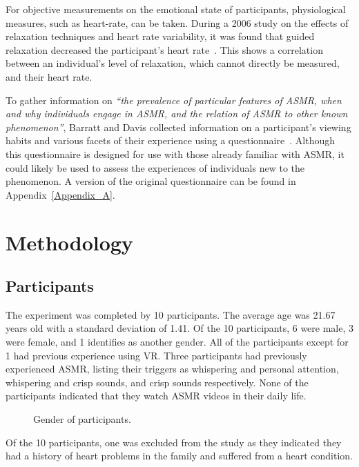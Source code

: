 \documentclass{sigchi}
\newcommand{\inlinequote}[1]{\textit{``#1''}}
\begin{document}
For objective measurements on the emotional state of participants, physiological measures, such as heart-rate, can be taken. During a 2006 study on the effects of relaxation techniques and heart rate variability, it was found that guided relaxation decreased the participant's heart rate~\cite{sarang2006effects}. This shows a correlation between an individual's level of relaxation, which cannot directly be measured, and their heart rate.

To gather information on \inlinequote{the prevalence of particular features of ASMR, when and why individuals engage in ASMR, and the relation of ASMR to other known phenomenon}, Barratt and Davis collected information on a participant's viewing habits and various facets of their experience using a questionnaire~\cite{barratt2015autonomous}. Although this questionnaire is designed for use with those already familiar with ASMR, it could likely be used to assess the experiences of individuals new to the phenomenon. A version of the original questionnaire can be found in Appendix~\ref{Appendix_A}. 



\section{Methodology}

\subsection{Participants}
The experiment was completed by 10 participants. The average age was 21.67 years old with a standard deviation of 1.41. Of the 10 participants, 6 were male, 3 were female, and 1 identifies as another gender. All of the participants except for 1 had previous experience using VR. Three participants had previously experienced ASMR, listing their triggers as whispering and personal attention, whispering and crisp sounds, and crisp sounds respectively. None of the participants indicated that they watch ASMR videos in their daily life.

\begin{figure}[htb]
\centering
{}
\caption{Gender of participants.}
\label{fig:gender}
\end{figure}

Of the 10 participants, one was excluded from the study as they indicated they had a history of heart problems in the family and suffered from a heart condition.
\end{document}
